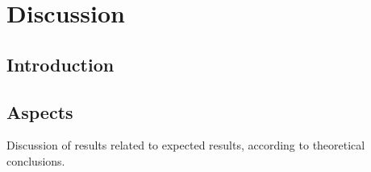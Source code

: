 \chapter{Discussion} 


\section{Introduction}

\section{Aspects}

Discussion of results related to expected results, according to theoretical conclusions.